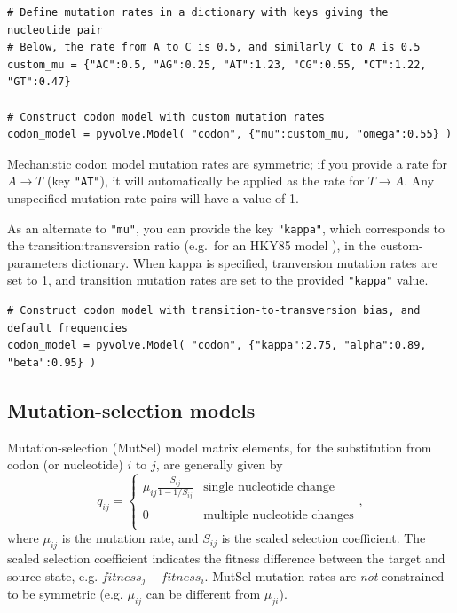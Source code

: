 \documentclass{article}
\newcommand{\code}[1]{\texttt{\small{#1}}}
\begin{document}
\begin{lstlisting}
# Define mutation rates in a dictionary with keys giving the nucleotide pair
# Below, the rate from A to C is 0.5, and similarly C to A is 0.5
custom_mu = {"AC":0.5, "AG":0.25, "AT":1.23, "CG":0.55, "CT":1.22, "GT":0.47} 

# Construct codon model with custom mutation rates
codon_model = pyvolve.Model( "codon", {"mu":custom_mu, "omega":0.55} )
\end{lstlisting}


Mechanistic codon model mutation rates are symmetric; if you provide a rate for $A \rightarrow T$ (key \code{"AT"}), it will automatically be applied as the rate for $T \rightarrow A$. Any unspecified mutation rate pairs will have a value of 1.

As an alternate to \code{"mu"}, you can provide the key \code{"kappa"}, which corresponds to the transition:transversion ratio (e.g.\ for an HKY85  model \citep{HKY85}), in the custom-parameters dictionary. When kappa is specified, tranversion mutation rates are set to 1, and transition mutation rates are set to the provided \code{"kappa"} value.

\begin{lstlisting}
# Construct codon model with transition-to-transversion bias, and default frequencies
codon_model = pyvolve.Model( "codon", {"kappa":2.75, "alpha":0.89, "beta":0.95} )
\end{lstlisting}



\subsection{Mutation-selection models}\label{sec:mutsel_basic}
Mutation-selection (MutSel) model \citep{HB98} matrix elements, for the substitution from codon (or nucleotide) $i$ to $j$, are generally given by 
\begin{equation}
q_{ij} = \left\{ 
\begin{array}{rl}
	\mu_{ij} \frac{S_{ij}}{1-1/S_{ij}} &\text{single nucleotide change} \\\\
	0                                  &\text{multiple nucleotide changes} \\             
\end{array} \right.,
\end{equation} where $\mu_{ij}$ is the mutation rate, and $S_{ij}$ is the scaled selection coefficient. The scaled selection coefficient indicates the fitness difference between the target and source state, e.g. $fitness_j - fitness_i$. MutSel mutation rates are \emph{not} constrained to be symmetric (e.g. $\mu_{ij}$ can be different from $\mu_{ji}$). 
\end{document}
